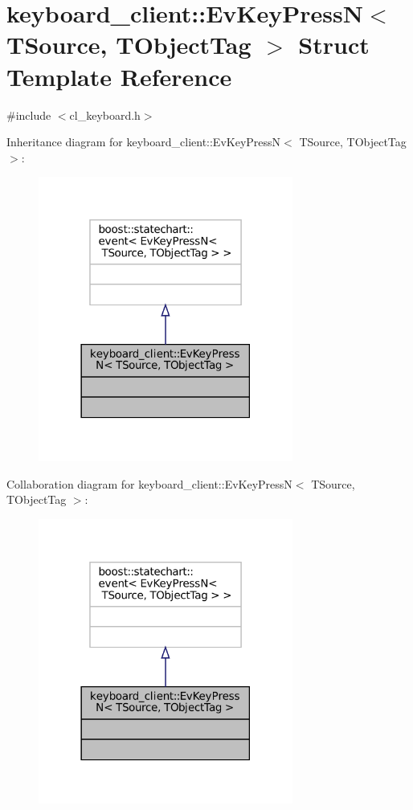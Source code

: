 \hypertarget{structkeyboard__client_1_1EvKeyPressN}{}\section{keyboard\+\_\+client\+:\+:Ev\+Key\+PressN$<$ T\+Source, T\+Object\+Tag $>$ Struct Template Reference}
\label{structkeyboard__client_1_1EvKeyPressN}


{\ttfamily \#include $<$cl\+\_\+keyboard.\+h$>$}



Inheritance diagram for keyboard\+\_\+client\+:\+:Ev\+Key\+PressN$<$ T\+Source, T\+Object\+Tag $>$\+:
\nopagebreak
\begin{figure}[H]
\begin{center}
\leavevmode
\includegraphics[width=237pt]{structkeyboard__client_1_1EvKeyPressN__inherit__graph}
\end{center}
\end{figure}


Collaboration diagram for keyboard\+\_\+client\+:\+:Ev\+Key\+PressN$<$ T\+Source, T\+Object\+Tag $>$\+:
\nopagebreak
\begin{figure}[H]
\begin{center}
\leavevmode
\includegraphics[width=237pt]{structkeyboard__client_1_1EvKeyPressN__coll__graph}
\end{center}
\end{figure}


